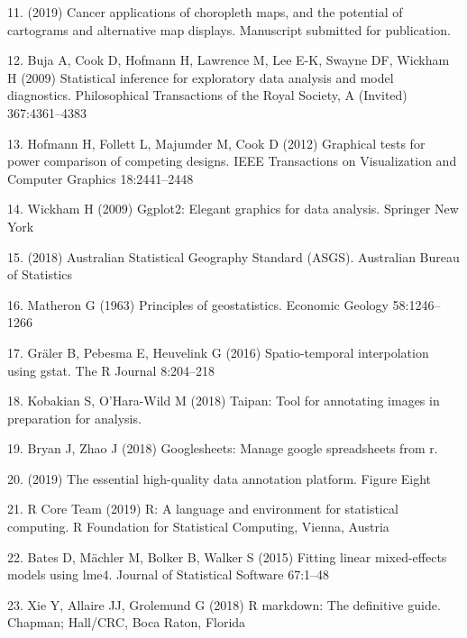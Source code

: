 \documentclass[conference,final,]{IEEEtran}
\begin{document}
\leavevmode\hypertarget{ref-review}{}%
11. (2019) Cancer applications of choropleth maps, and the potential of cartograms and alternative map displays. Manuscript submitted for publication.

\leavevmode\hypertarget{ref-BCHLLSW09}{}%
12. Buja A, Cook D, Hofmann H, Lawrence M, Lee E-K, Swayne DF, Wickham H (2009) Statistical inference for exploratory data analysis and model diagnostics. Philosophical Transactions of the Royal Society, A (Invited) 367:4361--4383

\leavevmode\hypertarget{ref-GTPCCD}{}%
13. Hofmann H, Follett L, Majumder M, Cook D (2012) Graphical tests for power comparison of competing designs. IEEE Transactions on Visualization and Computer Graphics 18:2441--2448

\leavevmode\hypertarget{ref-ggplot2}{}%
14. Wickham H (2009) Ggplot2: Elegant graphics for data analysis. Springer New York

\leavevmode\hypertarget{ref-abs2016}{}%
15. (2018) Australian Statistical Geography Standard (ASGS). Australian Bureau of Statistics

\leavevmode\hypertarget{ref-POG}{}%
16. Matheron G (1963) Principles of geostatistics. Economic Geology 58:1246--1266

\leavevmode\hypertarget{ref-gstat}{}%
17. Gräler B, Pebesma E, Heuvelink G (2016) Spatio-temporal interpolation using gstat. The R Journal 8:204--218

\leavevmode\hypertarget{ref-taipan}{}%
18. Kobakian S, O'Hara-Wild M (2018) Taipan: Tool for annotating images in preparation for analysis.

\leavevmode\hypertarget{ref-sheets}{}%
19. Bryan J, Zhao J (2018) Googlesheets: Manage google spreadsheets from r.

\leavevmode\hypertarget{ref-figeight}{}%
20. (2019) The essential high-quality data annotation platform. Figure Eight

\leavevmode\hypertarget{ref-RCore}{}%
21. R Core Team (2019) R: A language and environment for statistical computing. R Foundation for Statistical Computing, Vienna, Austria

\leavevmode\hypertarget{ref-lme4}{}%
22. Bates D, Mächler M, Bolker B, Walker S (2015) Fitting linear mixed-effects models using lme4. Journal of Statistical Software 67:1--48

\leavevmode\hypertarget{ref-rmarkdown}{}%
23. Xie Y, Allaire JJ, Grolemund G (2018) R markdown: The definitive guide. Chapman; Hall/CRC, Boca Raton, Florida
\end{document}
